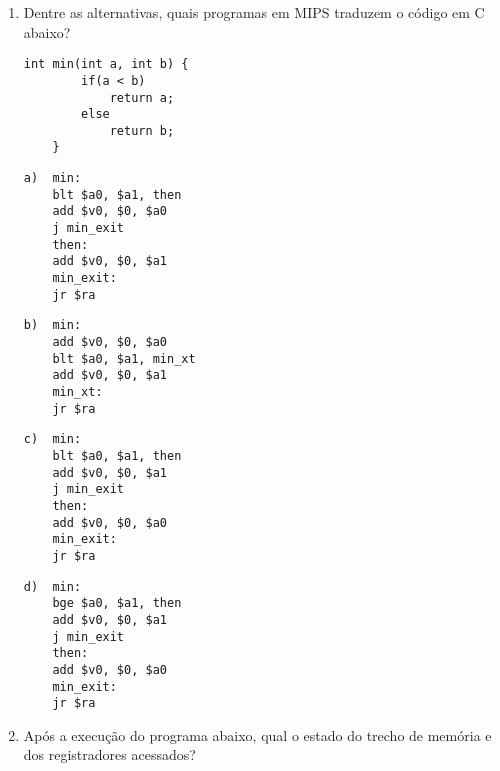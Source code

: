 \documentclass{article}
\begin{document}
\begin{enumerate}
\pagebreak
\item \large Dentre as alternativas, quais programas em MIPS traduzem o código em C abaixo?

\begin{center}
    \begin{minipage}{0.5\textwidth}
        \begin{lstlisting}[frame=single]
    int min(int a, int b) {
        if(a < b)
            return a;
        else
            return b;
    }
        \end{lstlisting}
    \end{minipage}
\end{center}

\begin{minipage}{0.4\textwidth}
    \begin{lstlisting}[frame=single]
a)  min:
    blt $a0, $a1, then
    add $v0, $0, $a0
    j min_exit
    then:
    add $v0, $0, $a1
    min_exit:
    jr $ra
    \end{lstlisting}
\end{minipage}
\hspace{1cm}
\begin{minipage}{0.4\textwidth}
    \begin{lstlisting}[frame=single]
b)  min:
    add $v0, $0, $a0
    blt $a0, $a1, min_xt
    add $v0, $0, $a1
    min_xt:
    jr $ra
    \end{lstlisting}%
\end{minipage}

\bigskip

\begin{minipage}{0.4\textwidth}
    \begin{lstlisting}[frame=single]
c)  min:
    blt $a0, $a1, then
    add $v0, $0, $a1
    j min_exit
    then:
    add $v0, $0, $a0
    min_exit:
    jr $ra
    \end{lstlisting}%
\end{minipage}
\hspace{1cm}
\begin{minipage}{0.4\textwidth}
    \begin{lstlisting}[frame=single]
d)  min:
    bge $a0, $a1, then
    add $v0, $0, $a1
    j min_exit
    then:
    add $v0, $0, $a0
    min_exit:
    jr $ra
    \end{lstlisting}
\end{minipage}

\pagebreak

\item \large Após a execução do programa abaixo, qual o estado do trecho de memória e dos registradores acessados?


\end{enumerate}
\end{document}
